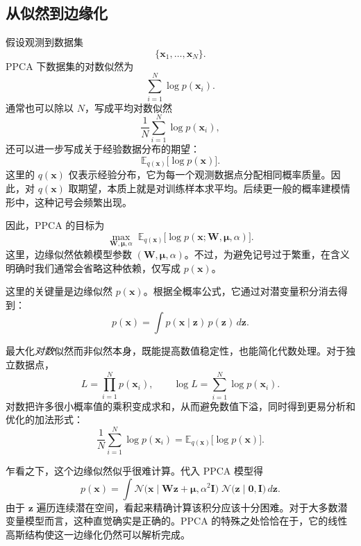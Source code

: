 \subsection{从似然到边缘化}
假设观测到数据集
\[
\{\mathbf{x}_1,\dots,\mathbf{x}_N\}.
\]
PPCA 下数据集的对数似然为
\[
\sum_{i=1}^N\log p(\mathbf{x}_i).
\]
通常也可以除以 \(N\)，写成平均对数似然
\[
\frac{1}{N}\sum_{i=1}^N\log p(\mathbf{x}_i),
\]
还可以进一步写成关于经验数据分布的期望：
\[
\mathbb{E}_{q(\mathbf{x})}\big[\log p(\mathbf{x})\big].
\]
这里的 \(q(\mathbf{x})\) 仅表示经验分布，它为每一个观测数据点分配相同概率质量。因此，对 \(q(\mathbf{x})\) 取期望，本质上就是对训练样本求平均。后续更一般的概率建模情形中，这种记号会频繁出现。

因此，PPCA 的目标为
\[
\max_{\mathbf{W},\boldsymbol{\mu},\alpha}
\;
\mathbb{E}_{q(\mathbf{x})}\big[\log p(\mathbf{x};\mathbf{W},\boldsymbol{\mu},\alpha)\big].
\]
这里，边缘似然依赖模型参数 \((\mathbf{W},\boldsymbol{\mu},\alpha)\)。不过，为避免记号过于繁重，在含义明确时我们通常会省略这种依赖，仅写成 \(p(\mathbf{x})\)。

这里的关键量是边缘似然 \(p(\mathbf{x})\)。根据全概率公式，它通过对潜变量积分消去得到：
\[
p(\mathbf{x})
=
\int p(\mathbf{x}\mid\mathbf{z})\,p(\mathbf{z})\,d\mathbf{z}.
\]

\begin{tcolorbox}[
  colback=blue!6,
  colframe=blue!55!black,
  title={为什么最大化对数似然而不是似然？},
  boxrule=0.8pt,
  arc=2mm,
  left=2mm,
  right=2mm,
  top=1mm,
  bottom=1mm
]
最大化\emph{对数}似然而非似然本身，既能提高数值稳定性，也能简化代数处理。对于独立数据点，
\[
L=\prod_{i=1}^N p(\mathbf{x}_i),
\qquad
\log L=\sum_{i=1}^N\log p(\mathbf{x}_i).
\]
对数把许多很小概率值的乘积变成求和，从而避免数值下溢，同时得到更易分析和优化的加法形式：
\[
\frac{1}{N}\sum_{i=1}^N\log p(\mathbf{x}_i)
=
\mathbb{E}_{q(\mathbf{x})}\big[\log p(\mathbf{x})\big].
\]
\end{tcolorbox}

乍看之下，这个边缘似然似乎很难计算。代入 PPCA 模型得
\[
p(\mathbf{x})
=
\int
\mathcal{N}\!\bigl(\mathbf{x}\mid\mathbf{W}\mathbf{z}+\boldsymbol{\mu},\alpha^2\mathbf{I}\bigr)
\;
\mathcal{N}\!\bigl(\mathbf{z}\mid\mathbf{0},\mathbf{I}\bigr)
\,d\mathbf{z}.
\]
由于 \(\mathbf{z}\) 遍历连续潜在空间，看起来精确计算该积分应该十分困难。对于大多数潜变量模型而言，这种直觉确实是正确的。PPCA 的特殊之处恰恰在于，它的线性高斯结构使这一边缘化仍然可以解析完成。


